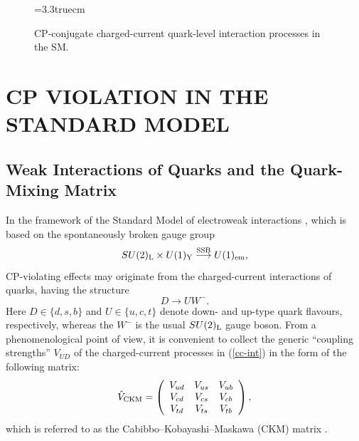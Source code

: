 \documentclass[11pt]{cernrep}
\begin{document}
\begin{figure}
\centerline{
\epsfysize=3.3truecm
}
\caption{CP-conjugate charged-current quark-level interaction processes
in the SM.}\label{fig:CC} 
\end{figure}



%
%
%
\section{CP VIOLATION IN THE STANDARD MODEL}\label{sec:CP-SM}
\setcounter{equation}{0}
%
%
%
\subsection{Weak Interactions of Quarks and the Quark-Mixing Matrix}
%
%
%
In the framework of the Standard Model of electroweak interactions 
\cite{buchmueller,SM}, which is based on the spontaneously broken gauge group
\begin{equation}
SU(2)_{\rm L}\times U(1)_{\rm Y}
\stackrel{{\rm SSB}}
{\longrightarrow}U(1)_{\rm em},
\end{equation}
CP-violating effects may originate from the charged-current 
interactions of quarks, having the structure
\begin{equation}\label{cc-int}
D\to U W^-.
\end{equation}
Here $D\in\{d,s,b\}$ and $U\in\{u,c,t\}$ denote down- and up-type quark 
flavours, respectively, whereas the $W^-$ is the usual $SU(2)_{\rm L}$ 
gauge boson. From a phenomenological point of view, it is convenient to 
collect the generic ``coupling strengths'' $V_{UD}$ of the charged-current 
processes in (\ref{cc-int}) in the form of the following matrix:
\begin{equation}\label{ckm0}
\hat V_{\rm CKM}=
\left(\begin{array}{ccc}
V_{ud}&V_{us}&V_{ub}\\
V_{cd}&V_{cs}&V_{cb}\\
V_{td}&V_{ts}&V_{tb}
\end{array}\right),
\end{equation}
which is referred to as the Cabibbo--Kobayashi--Maskawa (CKM) matrix
\cite{cab,KM}. 
\end{document}
